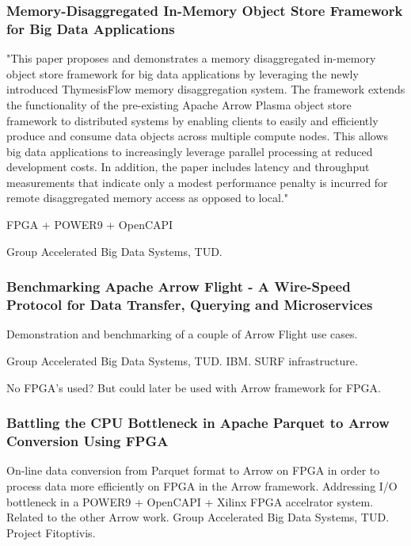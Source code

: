 \subsubsection{Memory-Disaggregated In-Memory Object Store Framework for Big Data Applications}
\cite{Abrahamse2022Memory-DisaggregatedApplications}
"This paper proposes and demonstrates
a memory disaggregated in-memory object store framework for
big data applications by leveraging the newly introduced ThymesisFlow
memory disaggregation system. The framework extends
the functionality of the pre-existing Apache Arrow Plasma object
store framework to distributed systems by enabling clients to
easily and efficiently produce and consume data objects across
multiple compute nodes. This allows big data applications to
increasingly leverage parallel processing at reduced development
costs. In addition, the paper includes latency and throughput
measurements that indicate only a modest performance penalty
is incurred for remote disaggregated memory access as opposed to
local."

FPGA + POWER9 + OpenCAPI

Group Accelerated Big Data Systems, TUD.















\subsubsection{Benchmarking Apache Arrow Flight - A Wire-Speed Protocol for Data Transfer, Querying and Microservices}
\cite{Ahmad2022BenchmarkingMicroservices}
Demonstration and benchmarking of a couple of Arrow Flight use cases.

Group Accelerated Big Data Systems, TUD. IBM. SURF infrastructure.

No FPGA's used? But could later be used with Arrow framework for FPGA.

\subsubsection{Battling the CPU Bottleneck in Apache Parquet to Arrow Conversion Using FPGA}
\cite{Peltenburg2020BattlingFPGA}
On-line data conversion from Parquet format to Arrow on FPGA in order to process data more efficiently on FPGA in the Arrow framework. Addressing I/O bottleneck in a POWER9 + OpenCAPI + Xilinx FPGA accelrator system. Related to the other Arrow work.
Group Accelerated Big Data Systems, TUD. Project Fitoptivis.

